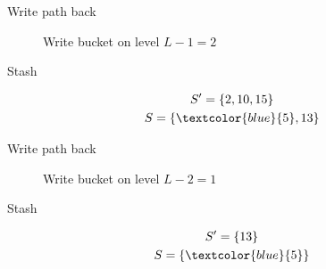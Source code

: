 	\begin{frame}{Write path back}

		\selectedtrue
		\pathreadtrue

		\nodeonenewtrue
		\nodetwonewtrue

		\begin{figure}
			\centering

			
			\caption{Write bucket on level $L - 1 = 2$}
		\end{figure}

		\vspace{-12pt}

		\begin{block}{Stash}
			
			\begin{gather*}
				S^\prime = \{ 2, 10, 15 \} \\
				S = \{ \textcolor{blue}{5}, 13 \}
			\end{gather*}

		\end{block}
		
	\end{frame}

	\begin{frame}{Write path back}

		\selectedtrue
		\pathreadtrue

		\nodeonenewtrue
		\nodetwonewtrue
		\nodethreenewtrue

		\begin{figure}
			\centering

			
			\caption{Write bucket on level $L - 2 = 1$}
		\end{figure}
		
		\vspace{-12pt}

		\begin{block}{Stash}
			
			\begin{gather*}
				S^\prime = \{ 13 \} \\
				S = \{ \textcolor{blue}{5} \}
			\end{gather*}

		\end{block}

	\end{frame}

